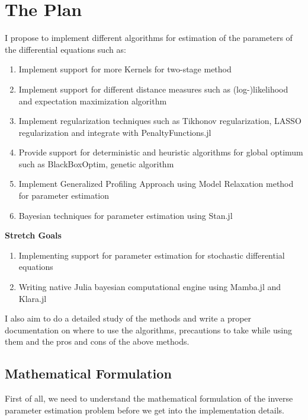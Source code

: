 \documentclass[11pt]{article}
\providecommand{\tightlist}{%
      \setlength{\itemsep}{0pt}\setlength{\parskip}{0pt}}
\begin{document}
    \section{The Plan}\label{the-plan}

I propose to implement different algorithms for estimation of the
parameters of the differential equations such as:

\begin{enumerate}
\def\labelenumi{\arabic{enumi}.}
\tightlist
\item
  Implement support for more Kernels for two-stage method
\item
  Implement support for different distance measures such as
  (log-)likelihood and expectation maximization algorithm
\item
  Implement regularization techniques such as Tikhonov regularization,
  LASSO regularization and integrate with PenaltyFunctions.jl
\item
  Provide support for deterministic and heuristic algorithms for global
  optimum such as BlackBoxOptim, genetic algorithm
\item
  Implement Generalized Profiling Approach using Model Relaxation method
  for parameter estimation
\item
  Bayesian techniques for parameter estimation using Stan.jl
\end{enumerate}

\textbf{Stretch Goals}

\begin{enumerate}
\def\labelenumi{\arabic{enumi}.}
\tightlist
\item
  Implementing support for parameter estimation for stochastic
  differential equations
\item
  Writing native Julia bayesian computational engine using Mamba.jl and
  Klara.jl
\end{enumerate}

I also aim to do a detailed study of the methods and write a proper
documentation on where to use the algorithms, precautions to take while
using them and the pros and cons of the above methods.

\subsection{Mathematical Formulation}\label{mathematical-formulation}

First of all, we need to understand the mathematical formulation of the
inverse parameter estimation problem before we get into the
implementation details.
\end{document}
